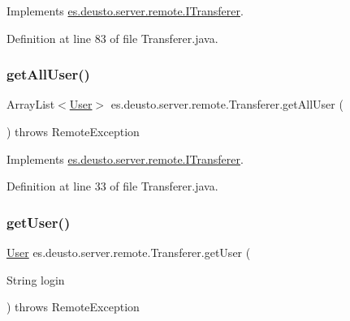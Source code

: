 Implements \hyperlink{interfacees_1_1deusto_1_1server_1_1remote_1_1_i_transferer_a71afa6799122b3f09805f86d2e58fc23}{es.\+deusto.\+server.\+remote.\+I\+Transferer}.



Definition at line 83 of file Transferer.\+java.

\mbox{\label{classes_1_1deusto_1_1server_1_1remote_1_1_transferer_a613c0c3af149140e58488ce9d0745593}} 
\subsubsection{\texorpdfstring{get\+All\+User()}{getAllUser()}}
{\footnotesize\ttfamily Array\+List$<$\hyperlink{classes_1_1deusto_1_1server_1_1db_1_1data_1_1_user}{User}$>$ es.\+deusto.\+server.\+remote.\+Transferer.\+get\+All\+User (\begin{DoxyParamCaption}{ }\end{DoxyParamCaption}) throws Remote\+Exception}



Implements \hyperlink{interfacees_1_1deusto_1_1server_1_1remote_1_1_i_transferer_aec6609427d773f075a78295a97888103}{es.\+deusto.\+server.\+remote.\+I\+Transferer}.



Definition at line 33 of file Transferer.\+java.

\mbox{\label{classes_1_1deusto_1_1server_1_1remote_1_1_transferer_a16976959aeb3080244422aeac061a23b}} 
\subsubsection{\texorpdfstring{get\+User()}{getUser()}}
{\footnotesize\ttfamily \hyperlink{classes_1_1deusto_1_1server_1_1db_1_1data_1_1_user}{User} es.\+deusto.\+server.\+remote.\+Transferer.\+get\+User (\begin{DoxyParamCaption}\item[{String}]{login }\end{DoxyParamCaption}) throws Remote\+Exception}



